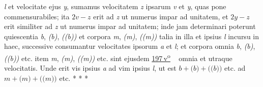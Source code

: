 \textit{l}
et velocitate ejus \textit{y},
sumamus velocitatem \textit{z}%
ipsarum \textit{v} et \textit{y},
quas pone commensurabiles;%
ita $2v - z$ erit ad \textit{z}
ut numerus impar ad unitatem,
et $2y - z$ erit similiter ad \textit{z}
ut numerus impar%
ad unitatem;%
inde jam determinari poterunt
quiescentia \textit{b}, \textit{(b)}, \textit{((b))}%
et corpora \textit{m}, \textit{(m)}, \textit{((m))}
talia
in illa
et ipsius \textit{l} incursu%
in haec,%
successive consumantur velocitates%
ipsorum \textit{a} et \textit{l};
et corpora omnia \textit{b}, \textit{(b)}, \textit{((b))} etc. %
item \textit{m}, \textit{(m)}, \textit{((m))} etc.
sint ejusdem
\lbrack%
\href{\Scan{LH_37_05_197v}}%
{197\,v\textsuperscript{o}}%
\rbrack\ %
omnia et utraque velocitatis.%
Unde erit vis ipsius \textit{a}
ad vim ipsius \textit{l},
ut est $b + \textit{(b)} + \textit{((b))}$ etc. %
ad $m + \textit{(m)} + \textit{((m))}$ etc.
\pend%
\vspace{4.0em}%
\pstart%
\noindent%
\centering%
*     *     *
\pend%
\frenchspacing%
\vspace{4.0em}%
